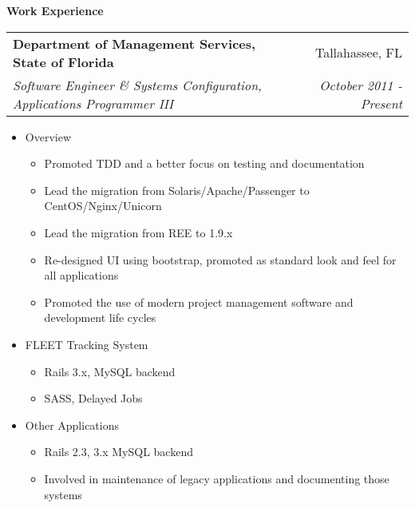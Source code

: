 \documentclass[letterpaper,11pt]{article}
\makeatletter
\newcommand{\resitem}[1]{\item #1 \vspace{-2pt}}
\newcommand{\resheading}[1]{{\large \colorbox{myblue}{\begin{minipage}{\textwidth}{\textbf{#1 \vphantom{p\^{E}}}}\end{minipage}}}}
\newcommand{\ressubheading}[4]{
\begin{tabular*}{7.0in}{l@{\extracolsep{\fill}}r}
		\textbf{#1} & #2 \\
		\textit{#3} & \textit{#4} \\
\end{tabular*}\vspace{-6pt}}
\makeatother
\begin{document}
\resheading{Work Experience}
\ressubheading{Department of Management Services, State of Florida}{Tallahassee, FL}{Software Engineer \& Systems Configuration, Applications Programmer III}{October 2011 - Present}
\begin{itemize}
        \resitem{Overview} 
        \begin{itemize}
                \resitem{Promoted TDD and a better focus on testing and documentation}
                \resitem{Lead the migration from Solaris/Apache/Passenger to CentOS/Nginx/Unicorn}
                \resitem{Lead the migration from REE to 1.9.x}
                \resitem{Re-designed UI using bootstrap, promoted as standard look and feel for all applications}
                \resitem{Promoted the use of modern project management software and development life cycles}
        \end{itemize}
        \resitem{FLEET Tracking System}
        \begin{itemize}
                \resitem{Rails 3.x, MySQL backend}
                \resitem{SASS, Delayed Jobs}
        \end{itemize}
        \resitem{Other Applications}
        \begin{itemize}
                \resitem{Rails 2.3, 3.x MySQL backend}
                \resitem{Involved in maintenance of legacy applications and documenting those systems}
        \end{itemize}
\end{itemize}

\pagebreakwithheader
\end{document}
